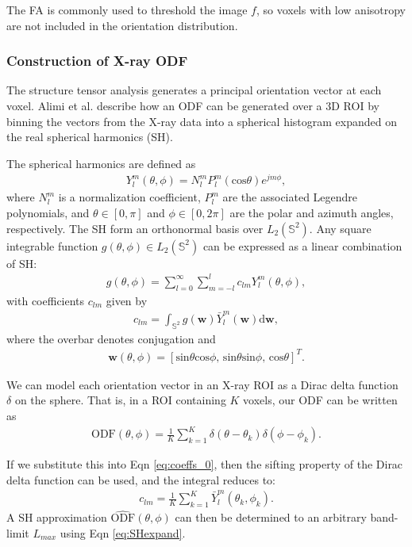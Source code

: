 \documentclass[11pt]{article}
\begin{document}
The FA is commonly used to threshold the image $f$, so voxels with low
anisotropy are not included in the orientation distribution.

\subsubsection{Construction of X-ray ODF}\label{alimi}
The structure tensor analysis generates a principal orientation
vector at each voxel. Alimi et al. \cite{Alimi2018} describe how
an ODF can be generated over a 3D ROI by binning the vectors from the X-ray data
into a spherical histogram expanded on the real spherical harmonics (SH).


The spherical harmonics are defined as
\begin{align}
  Y_l^m(\theta, \phi) = N_l^m P_l^m(\text{cos}\theta)e^{jm\phi},
\end{align}
where $N_l^m$ is a normalization coefficient, $P_l^m$ are the
associated Legendre polynomials, and $\theta \in [0, \pi]$ and $\phi \in [0, 2\pi]$
are the polar and azimuth angles, respectively. 
The SH form an orthonormal basis over $L_2(\mathbb{S}^2)$. Any
square integrable function $g(\theta, \phi) \in L_2(\mathbb{S}^2)$ can
be expressed as a linear combination of SH:
\begin{align}
  g(\theta, \phi) = \sum_{l=0}^{\infty}\sum_{m=-l}^l c_{lm}Y_l^m(\theta, \phi),
  \label{eq:SHexpand}
\end{align}
with coefficients $c_{lm}$ given by
\begin{align}
  c_{lm} = \int_{\mathbb{S}^2} g(\bm{w}) \bar{Y}_l^m(\bm{w}) \mathrm{d}\bm{w},
  \label{eq:coeffs_0}
\end{align}
where the overbar denotes conjugation and
\begin{align}
  \bm{w}(\theta, \phi) = [\text{sin}\theta\text{cos}\phi\text{, }  \text{sin}\theta \text{sin}\phi\text{, }  \text{cos}\theta]^T.
\end{align}

We can model each orientation vector in an X-ray ROI as a Dirac delta function
$\delta$ on the sphere. That is, in a ROI containing $K$ voxels, our ODF
can be written as
\begin{align}
  \text{ODF}(\theta, \phi) = \frac{1}{K}\sum_{k=1}^K \delta(\theta - \theta_k)\delta(\phi - \phi_k).
\end{align}

If we substitute this into Eqn \ref{eq:coeffs_0}, then the sifting property of the Dirac
delta function can be used, and the integral reduces to:
\begin{align}
  c_{lm} = \frac{1}{K}\sum_{k=1}^K \bar{Y}_l^m(\theta_k, \phi_k).
  \label{eq:get_coeffs}
\end{align}
A SH approximation $\hat{\text{ODF}}(\theta, \phi)$ can then be determined to an arbitrary
band-limit $L_{max}$ using Eqn \ref{eq:SHexpand}.
\end{document}
